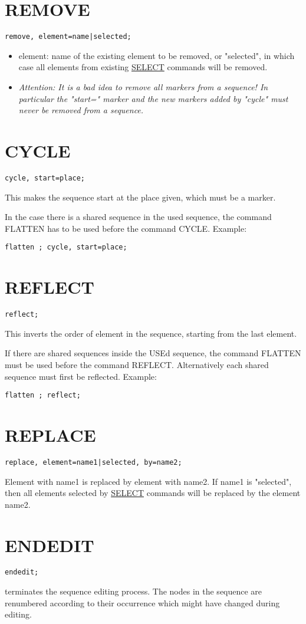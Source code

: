 \section{REMOVE}
\begin{verbatim}
remove, element=name|selected;
\end{verbatim}
\begin{itemize}
   \item element: name of the existing element to be removed, or
     "selected", in which case all elements from existing
     \href{../Introduction/select.html}{SELECT} commands will be
     removed. 
   \item \textit{Attention: It is a bad idea to remove all markers from
     a sequence! In particular the "start=" marker and the new markers
     added by "cycle" must never be removed from a sequence.} 
\end{itemize}


\section{CYCLE}
\begin{verbatim}
cycle, start=place;
\end{verbatim} 
This makes the sequence start at the place given, which must be a marker. 

In the case there is a shared sequence in the used sequence, the
command FLATTEN has to be used before the command CYCLE. Example:  
\begin{verbatim}
flatten ; cycle, start=place; 
\end{verbatim}


\section{REFLECT}
\begin{verbatim}
reflect;
\end{verbatim} 
This inverts the order of element in the sequence, starting from the last element. 

If there are shared sequences inside the USEd sequence, the command
FLATTEN must be used before the command REFLECT.  Alternatively each
shared sequence must first be reflected. Example:   
\begin{verbatim}
flatten ; reflect; 
\end{verbatim}


\section{REPLACE}
\begin{verbatim}
replace, element=name1|selected, by=name2;
\end{verbatim} 
Element with name1 is replaced by element with name2. 
If name1 is "selected", then all elements selected by
\href{../Introduction/select.html}{SELECT} commands will be replaced by
the element name2.  


\section{ENDEDIT}
\begin{verbatim}
endedit;
\end{verbatim} 
terminates the sequence editing process. The nodes in the sequence are
renumbered according to their occurrence which might have changed during
editing.  


